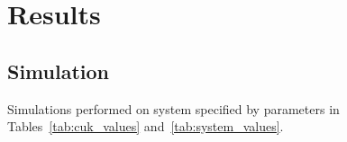 \section{Results}
\subsection{Simulation}
Simulations performed on system specified by parameters in Tables~\ref{tab:cuk_values} and~\ref{tab:system_values}.
